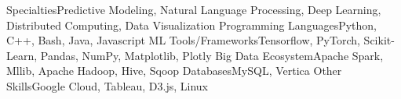 \vspace{-2mm}
\vspace{-3.5mm}
\begin{cvskills}
\cvskill
{Specialties}{Predictive Modeling, Natural Language Processing, Deep Learning, Distributed Computing, Data Visualization}
\cvskill
{Programming Languages}{Python, C++, Bash, Java, Javascript}
\cvskill
{ML Tools/Frameworks}{Tensorflow, PyTorch, Scikit-Learn, Pandas, NumPy, Matplotlib, Plotly}
\cvskill
{Big Data Ecosystem}{Apache Spark, Mllib, Apache Hadoop, Hive, Sqoop}
\cvskill
{Databases}{MySQL, Vertica}
\cvskill
{Other Skills}{Google Cloud, Tableau, D3.js, Linux}
\end{cvskills}
